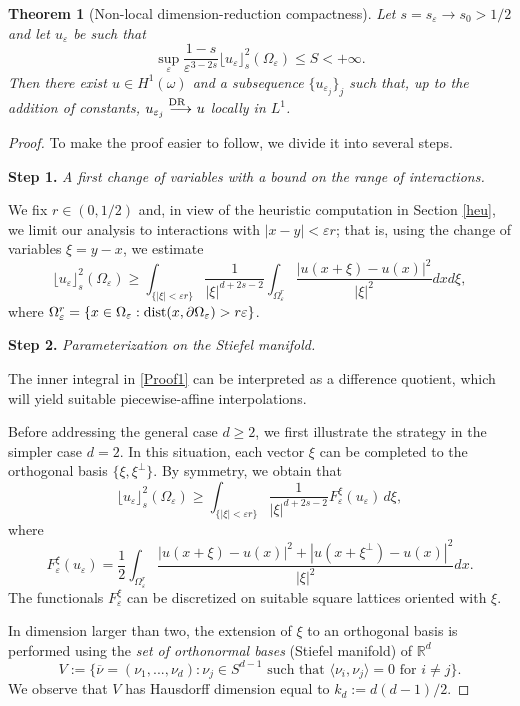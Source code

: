\documentclass[11pt]{article}
\newtheorem{theorem}[definition]{Theorem}
\def\e{\varepsilon}
\begin{document}
\begin{theorem}[Non-local dimension-reduction compactness]\label{nlcth-1}
Let $s=s_\e\to s_0>1/2$ and let $u_\e$ be such that $$\sup_\e\frac{1-s}{\e^{3-2s}}\lfloor u_\e\rfloor_s^2(\Omega_\e)\le S<+\infty.$$Then there exist $u\in H^1(\omega)$ and a subsequence $\{u_{\e_j}\}_j$ such that, up to the addition of constants, 
$u_{\e_j}\buildrel{\hbox {\rm\scriptsize DR }\, \, }\over{\longrightarrow} u$ locally in $L^1$.
\end{theorem}

\begin{proof} To make the proof easier to follow, we divide it into several steps.

\smallskip
{\bf Step 1.} {\em A first change of variables with a bound on the range of interactions.}

\smallskip
We fix $r\in (0,1/2)$ and, in view of the heuristic computation in Section \ref{heu}, we limit our analysis to interactions with $|x-y|<\e r$; that is, using the change of variables $\xi=y-x$, we estimate
\begin{equation}\label{Proof1}
\lfloor u_\e\rfloor_s^2(\Omega_\e)
\ge \int_{\{|\xi|<\e r\}}\frac1{|\xi|^{d+2s-2}}\int_{\Omega_\e^r}\frac{|u(x+\xi)-u(x)|^2}{|\xi|^2}dx d\xi,
\end{equation}
where $\Omega_\e^r=\{x\in\Omega_\e:{\rm dist}(x,\partial \Omega_\e)> r\e\}$.

\medskip
{\bf Step 2.} {\em Parameterization on the {\em Stiefel} manifold.}

\smallskip
The inner integral in \eqref{Proof1} can be interpreted as a difference quotient, which will yield suitable piecewise-affine interpolations. 

 
Before addressing the general case $d \geq 2$, we first illustrate the strategy in the simpler case $d=2$. In this situation, each vector $\xi$ can be completed to the orthogonal basis $\{\xi, \xi^\perp\}$. By symmetry, we obtain that 
$$\lfloor u_\e\rfloor_s^2(\Omega_\e)\geq \int_{\{|\xi|<\e r\}}\frac1{|\xi|^{d+2s-2}}F_\e^\xi(u_\e)\, d\xi,$$ 
where 
$$F_\e^\xi(u_\e)=\frac{1}{2}\int_{\Omega_\e^r}\frac{|u(x+\xi)-u(x)|^2+|u(x+\xi^\perp)-u(x)|^2}{|\xi|^2}dx. $$
The functionals $F_\e^\xi$ can be discretized on suitable square lattices oriented with $\xi$. 

In dimension larger than two, the extension of $\xi$ to an orthogonal basis is performed using the  
 {\em set of orthonormal bases} (Stiefel manifold) of $\mathbb{R}^d$
\[
V:=\{\overline{\nu}=(\nu_1,...,\nu_d) : \nu_j \in S^{d-1} \text{ such that } \langle\nu_i, \nu_j\rangle=0 \text{ for } i\neq j \}.
\]
We observe that $V$ has Hausdorff dimension equal to $k_d:=d(d-1)/2$. 


\end{proof}
\end{document}
